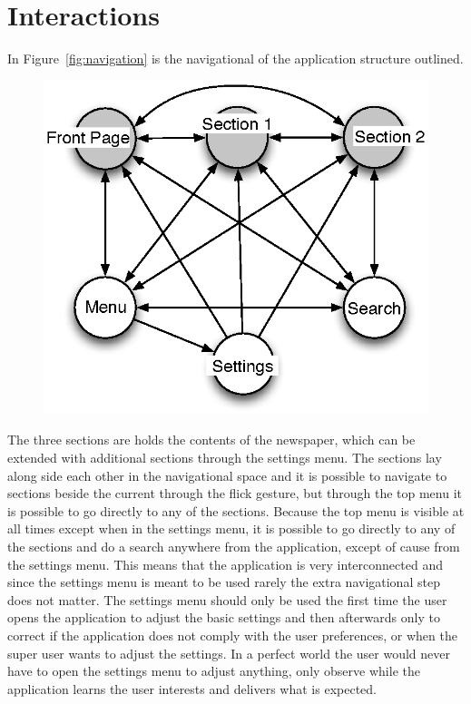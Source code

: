 \section{Interactions}%
In Figure~\ref{fig:navigation} is the navigational of the application structure outlined. 
\begin{figure}[h!tp]
	\myfloatalign
		\includegraphics[width=.45\textwidth]{img/navigation}
\end{figure}

The three sections are holds the contents of the newspaper, which can be extended with additional sections through the settings menu. The sections lay along side each other in the navigational space and it is possible to navigate to sections beside the current through the flick gesture, but through the top menu it is possible to go directly to any of the sections. Because the top menu is visible at all times except when in the settings menu, it is possible to go directly to any of the sections and do a search anywhere from the application, except of cause from the settings menu. This means that the application is very interconnected and since the settings menu is meant to be used rarely the extra navigational step does not matter. The settings menu should only be used the first time the user opens the application to adjust the basic settings and then afterwards only to correct if the application does not comply with the user preferences, or when the super user wants to adjust the settings. In a perfect world the user would never have to open the settings menu to adjust anything, only observe while the application learns the user interests and delivers what is expected.

